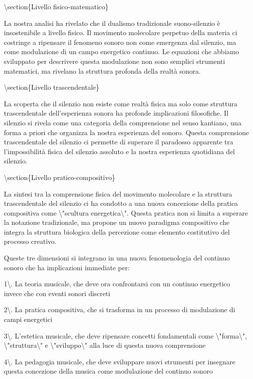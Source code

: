 \documentclass[a4paper,11pt]{article}
\begin{document}
\textbackslash{}section\{Livello fisico-matematico\}

La nostra analisi ha rivelato che il dualismo tradizionale
suono-silenzio \`e insostenibile a livello fisico. Il movimento molecolare
perpetuo della materia ci costringe a ripensare il fenomeno sonoro non
come emergenza dal silenzio, ma come modulazione di un campo energetico
continuo. Le equazioni che abbiamo sviluppato per descrivere questa
modulazione non sono semplici strumenti matematici, ma rivelano la
struttura profonda della realt\`a sonora.

\textbackslash{}section\{Livello trascendentale\}

La scoperta che il silenzio non esiste come realt\`a fisica ma solo come
struttura trascendentale dell'esperienza sonora ha profonde implicazioni
filosofiche. Il silenzio si rivela come una categoria della comprensione
nel senso kantiano, una forma a priori che organizza la nostra
esperienza del sonoro. Questa comprensione trascendentale del silenzio
ci permette di superare il paradosso apparente tra l'impossibilit\`a
fisica del silenzio assoluto e la nostra esperienza quotidiana del
silenzio.

\textbackslash{}section\{Livello pratico-compositivo\}

La sintesi tra la comprensione fisica del movimento molecolare e la
struttura trascendentale del silenzio ci ha condotto a una nuova
concezione della pratica compositiva come \textbackslash{}"scultura energetica\textbackslash{}".
Questa pratica non si limita a superare la notazione tradizionale, ma
propone un nuovo paradigma compositivo che integra la struttura
biologica della percezione come elemento costitutivo del processo
creativo.

Queste tre dimensioni si integrano in una nuova fenomenologia del
continuo sonoro che ha implicazioni immediate per:

1\textbackslash{}. La teoria musicale, che deve ora confrontarsi con un continuo
energetico invece che con eventi sonori discreti

2\textbackslash{}. La pratica compositiva, che si trasforma in un processo di
modulazione di campi energetici

3\textbackslash{}. L'estetica musicale, che deve ripensare concetti fondamentali come
\textbackslash{}"forma\textbackslash{}", \textbackslash{}"struttura\textbackslash{}" e \textbackslash{}"sviluppo\textbackslash{}" alla luce di questa nuova
comprensione

4\textbackslash{}. La pedagogia musicale, che deve sviluppare nuovi strumenti per
insegnare questa concezione della musica come modulazione del continuo
sonoro
\end{document}
